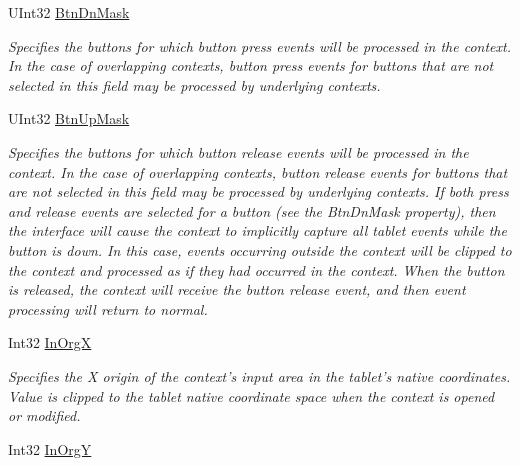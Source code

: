 \begin{DoxyCompactItemize}
UInt32 \hyperlink{class_wintab_d_n_1_1_c_wintab_context_a79c3b4d587970e2282a6931494adba2e}{BtnDnMask}
\begin{DoxyCompactList}\small\item\em Specifies the buttons for which button press events will be processed in the context. In the case of overlapping contexts, button press events for buttons that are not selected in this field may be processed by underlying contexts. \item\end{DoxyCompactList}\item 
UInt32 \hyperlink{class_wintab_d_n_1_1_c_wintab_context_a042b96b3c968d2f06eaa8f8d055852a5}{BtnUpMask}
\begin{DoxyCompactList}\small\item\em Specifies the buttons for which button release events will be processed in the context. In the case of overlapping contexts, button release events for buttons that are not selected in this field may be processed by underlying contexts. If both press and release events are selected for a button (see the BtnDnMask property), then the interface will cause the context to implicitly capture all tablet events while the button is down. In this case, events occurring outside the context will be clipped to the context and processed as if they had occurred in the context. When the button is released, the context will receive the button release event, and then event processing will return to normal. \item\end{DoxyCompactList}\item 
Int32 \hyperlink{class_wintab_d_n_1_1_c_wintab_context_a29428a202facd739a6752b7dbd1ef9c2}{InOrgX}
\begin{DoxyCompactList}\small\item\em Specifies the X origin of the context's input area in the tablet's native coordinates. Value is clipped to the tablet native coordinate space when the context is opened or modified. \item\end{DoxyCompactList}\item 
Int32 \hyperlink{class_wintab_d_n_1_1_c_wintab_context_ac8a0697447e7560bae747c396f27e73f}{InOrgY}

\end{DoxyCompactItemize}

